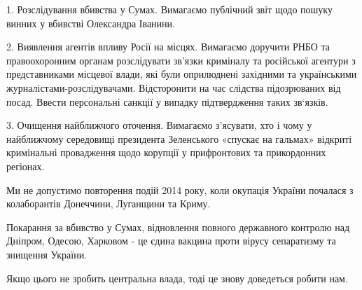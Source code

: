 1. Розслідування вбивства у Сумах. Вимагаємо публічний звіт щодо пошуку винних
у вбивстві Олександра Іванини. 

2. Виявлення агентів впливу Росії на місцях. Вимагаємо доручити РНБО та
правоохоронним органам розслідувати зв’язки криміналу та російської агентури з
представниками місцевої влади, які були оприлюднені західними та українськими
журналістами-розслідувачами. Відсторонити на час слідства підозрюваних від
посад. Ввести персональні санкції у випадку підтвердження таких зв‘язків.

3. Очищення найближчого оточення. Вимагаємо з’ясувати, хто і чому у найближчому
середовищі президента Зеленського «спускає на гальмах» відкриті кримінальні
провадження щодо корупції у прифронтових та прикордонних регіонах.

Ми не допустимо повторення подій 2014 року, коли окупація України почалася з
колаборантів Донеччини, Луганщини та Криму.

Покарання за вбивство у Сумах, відновлення повного державного контролю над
Дніпром, Одесою, Харковом - це єдина вакцина проти вірусу сепаратизму та
знищення України.

Якщо цього не зробить центральна влада, тоді це знову доведеться робити нам.

